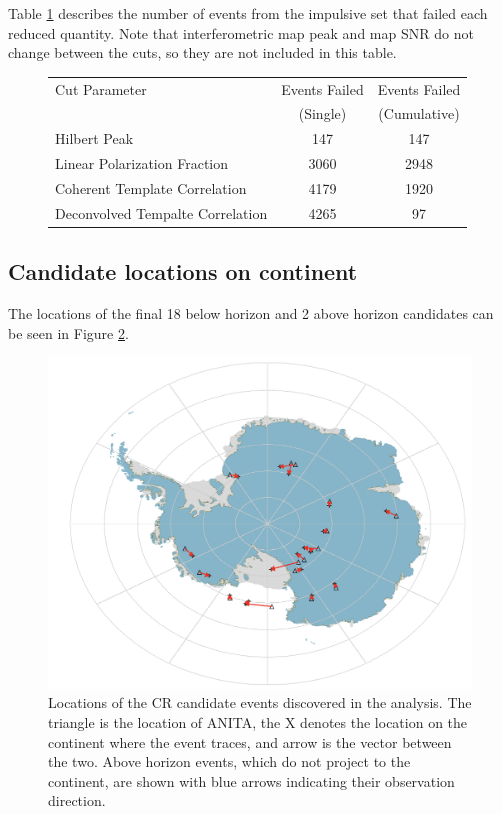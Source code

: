 	
		
		Table \ref{tab:signalCutReason} describes the number of events from the impulsive set that failed each reduced quantity.  Note that interferometric map peak and map SNR do not change between the cuts, so they are not included in this table.
		
		\begin{figure}
		\centering
		\begin{tabular}[c]{|l|c|c|}
		\hline
		Cut Parameter & Events Failed & Events Failed \\
		 & (Single) &  (Cumulative) \\
		\hline
		Hilbert Peak & 147 & 147\\
		Linear Polarization Fraction & 3060 & 2948\\
		Coherent Template Correlation & 4179 & 1920\\
		Deconvolved Tempalte Correlation & 4265 & 97\\
		\hline
		\end{tabular}
		\caption{}
		\label{tab:signalCutReason}
		\end{figure}
		
		
	\subsection{Candidate locations on continent}
		The locations of the final 18 below horizon and 2 above horizon candidates can be seen in Figure \ref{fig:downwardEventMap}.
		
			\begin{figure}
			\centering
				\includegraphics[width=\textwidth]{figures/downwardEventMap}
				\caption{Locations of the CR candidate events discovered in the analysis.  The triangle is the location of ANITA, the X denotes the location on the continent where the event traces, and arrow is the vector between the two.  Above horizon events, which do not project to the continent, are shown with blue arrows indicating their observation direction.}
			\label{fig:downwardEventMap}
			\end{figure}		

